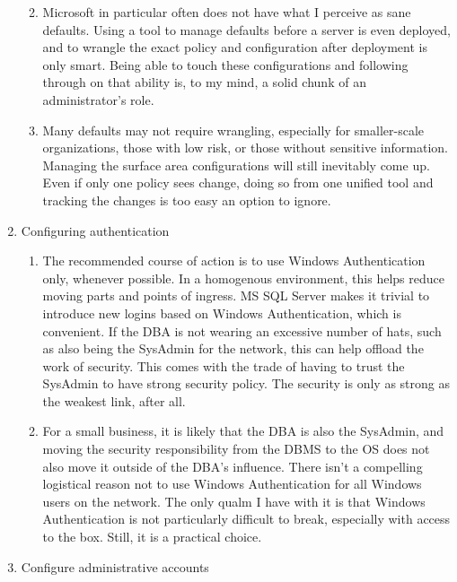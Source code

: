 \begin{enumerate}
  \begin{enumerate}
  \def\labelenumii{\arabic{enumii}.}
  \item
    Microsoft in particular often does not have what I perceive as sane
    defaults. Using a tool to manage defaults before a server is even
    deployed, and to wrangle the exact policy and configuration after
    deployment is only smart. Being able to touch these configurations
    and following through on that ability is, to my mind, a solid chunk
    of an administrator's role.
  \item
    Many defaults may not require wrangling, especially for
    smaller-scale organizations, those with low risk, or those without
    sensitive information. Managing the surface area configurations will
    still inevitably come up. Even if only one policy sees change, doing
    so from one unified tool and tracking the changes is too easy an
    option to ignore.
  \end{enumerate}
\item
  Configuring authentication

  \begin{enumerate}
  \def\labelenumii{\arabic{enumii}.}
  \item
    The recommended course of action is to use Windows Authentication
    only, whenever possible. In a homogenous environment, this helps
    reduce moving parts and points of ingress. MS SQL Server makes it
    trivial to introduce new logins based on Windows Authentication,
    which is convenient. If the DBA is not wearing an excessive number
    of hats, such as also being the SysAdmin for the network, this can
    help offload the work of security. This comes with the trade of
    having to trust the SysAdmin to have strong security policy. The
    security is only as strong as the weakest link, after all.
  \item
    For a small business, it is likely that the DBA is also the
    SysAdmin, and moving the security responsibility from the DBMS to
    the OS does not also move it outside of the DBA's influence. There
    isn't a compelling logistical reason not to use Windows
    Authentication for all Windows users on the network. The only qualm
    I have with it is that Windows Authentication is not particularly
    difficult to break, especially with access to the box. Still, it is
    a practical choice.
  \end{enumerate}
\item
  Configure administrative accounts


\end{enumerate}
